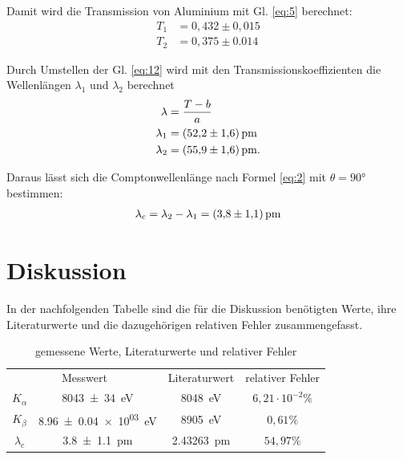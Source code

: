 Damit wird die Transmission von Aluminium mit Gl. \eqref{eq:5} berechnet:
\begin{subequations}
\begin{align}
    T_1 &= 0,432\pm 0,015 \label{16a}\\
    T_2 &= 0,375\pm 0.014 \label{16b} 
\end{align}
\end{subequations}

Durch Umstellen der Gl. \eqref{eq:12} wird mit den Transmissionskoeffizienten
die Wellenlängen $\lambda _1$ und $\lambda _2$ berechnet
\begin{subequations}
\begin{align}
    \lambda &= \frac{T-b}{a} \label{17a}\\
    \lambda _1 &= \SI{52,2+-1.6}{\pico\meter} \label{17b}\\
    \lambda _2 &= \SI{55,9+-1.6}{\pico\meter} \label{17c}.
\end{align}
\end{subequations}

Daraus lässt sich die Comptonwellenlänge nach Formel \eqref{eq:2} mit $\theta = 90°$
bestimmen:
\begin{align}
    \lambda _c = \lambda _2 - \lambda _1 = \SI{3,8+-1,1}{\pico\meter} \label{eq:18}
\end{align}



\section{Diskussion}

In der nachfolgenden Tabelle sind die für die Diskussion benötigten Werte, ihre Literaturwerte und
die dazugehörigen relativen Fehler zusammengefasst.
\begin{table}[H]
\centering
\begin{tabular}{c c c c}
\toprule
\multicolumn{2}{c}{Messwert}& \multicolumn{1}{c}{Literaturwert}& \multicolumn{1}{c}{relativer Fehler} \\
\cmidrule(lr){1-4} 
$K_{\alpha}$    &   \SI{8043+-34}{\electronvolt} & \SI{8048}{\electronvolt} \cite{K_Linie} & $6,21\cdot 10^{-2 }\%$\\
$K_{\beta} $    &   \SI{8,96+-0.04e03}{\electronvolt} & \SI{8905}{\electronvolt} \cite{K_Linie} & $0,61\%$\\
$\lambda _c $    &   \SI{3,8+-1,1}{\pico\meter} & \SI{2.43263}{\pico\meter} \cite{nolting2013grundlagen} & $54,97\%$\\
\bottomrule
\end{tabular}
\caption{gemessene Werte, Literaturwerte und relativer Fehler}
\label{tab:3}
\end{table}

